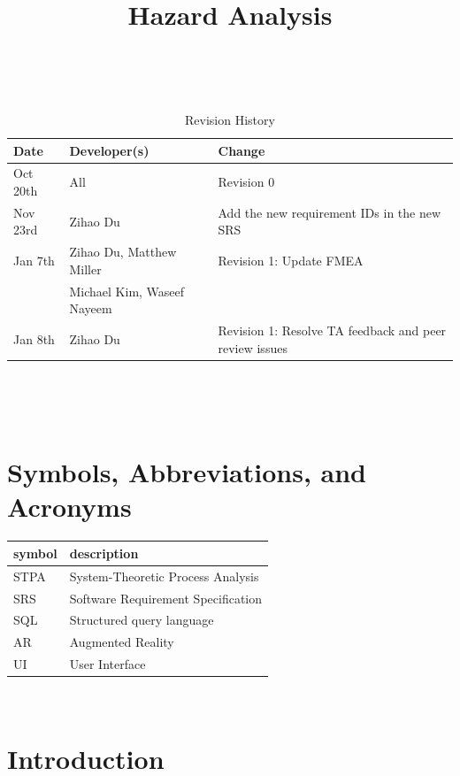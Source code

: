 \documentclass{article}
\title{Hazard Analysis\\\progname}
\author{\authname}
\date{}
\begin{document}
\maketitle
\thispagestyle{empty}

~\newpage


\begin{table}[hp]
\caption{Revision History} \label{TblRevisionHistory}
\begin{tabularx}{\textwidth}{llX}
\toprule
\textbf{Date} & \textbf{Developer(s)} & \textbf{Change}\\
\midrule
Oct 20th & All & Revision 0\\
Nov 23rd & Zihao Du & Add the new requirement IDs in the new SRS\\
Jan 7th & Zihao Du, Matthew Miller & Revision 1: Update FMEA\\
& Michael Kim, Waseef Nayeem & \\
Jan 8th & Zihao Du & Revision 1: Resolve TA feedback and peer review issues\\
\bottomrule
\end{tabularx}
\end{table}

~\newpage

\tableofcontents

~\newpage


\section{Symbols, Abbreviations, and Acronyms}

\renewcommand{\arraystretch}{1.2}
\begin{tabular}{l l} 
  \toprule		
  \textbf{symbol} & \textbf{description}\\
  \midrule 
  STPA & System-Theoretic Process Analysis\\
  \midrule
  SRS & Software Requirement Specification\\
  \midrule
  SQL & Structured query language\\
  \midrule
  AR & Augmented Reality\\
  \midrule
  UI & User Interface\\
  \bottomrule
\end{tabular}\\

\section{Introduction}
\end{document}
